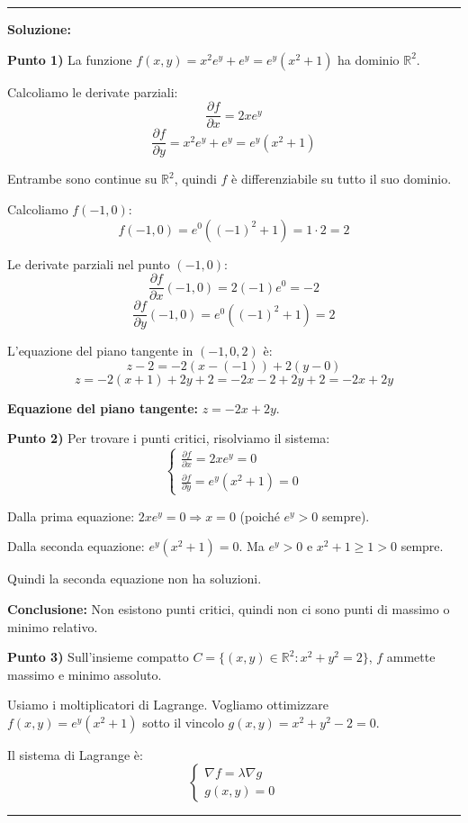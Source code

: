 \documentclass[12pt, a4paper]{article}
\newenvironment{solution}
{\par\noindent\rule{\textwidth}{0.4pt}\par\textbf{Soluzione:}\medskip\par}
{\par\rule{\textwidth}{0.4pt}\par\bigskip}
\begin{document}
\begin{solution}
\textbf{Punto 1)} La funzione $f(x,y) = x^2 e^y + e^y = e^y(x^2 + 1)$ ha dominio $\mathbb{R}^2$.

Calcoliamo le derivate parziali:
\[
\frac{\partial f}{\partial x} = 2xe^y
\]
\[
\frac{\partial f}{\partial y} = x^2 e^y + e^y = e^y(x^2 + 1)
\]

Entrambe sono continue su $\mathbb{R}^2$, quindi $f$ è differenziabile su tutto il suo dominio.

Calcoliamo $f(-1,0)$:
\[
f(-1,0) = e^0((-1)^2 + 1) = 1 \cdot 2 = 2
\]

Le derivate parziali nel punto $(-1,0)$:
\[
\frac{\partial f}{\partial x}(-1,0) = 2(-1)e^0 = -2
\]
\[
\frac{\partial f}{\partial y}(-1,0) = e^0((-1)^2 + 1) = 2
\]

L'equazione del piano tangente in $(-1,0,2)$ è:
\[
z - 2 = -2(x - (-1)) + 2(y - 0)
\]
\[
z = -2(x + 1) + 2y + 2 = -2x - 2 + 2y + 2 = -2x + 2y
\]

\textbf{Equazione del piano tangente:} $z = -2x + 2y$.

\vspace{0.5cm}

\textbf{Punto 2)} Per trovare i punti critici, risolviamo il sistema:
\[
\begin{cases}
\frac{\partial f}{\partial x} = 2xe^y = 0 \\
\frac{\partial f}{\partial y} = e^y(x^2 + 1) = 0
\end{cases}
\]

Dalla prima equazione: $2xe^y = 0 \Rightarrow x = 0$ (poiché $e^y > 0$ sempre).

Dalla seconda equazione: $e^y(x^2 + 1) = 0$. Ma $e^y > 0$ e $x^2 + 1 \geq 1 > 0$ sempre.

Quindi la seconda equazione non ha soluzioni.

\textbf{Conclusione:} Non esistono punti critici, quindi non ci sono punti di massimo o minimo relativo.

\vspace{0.5cm}

\textbf{Punto 3)} Sull'insieme compatto $C = \{(x,y) \in \mathbb{R}^2 : x^2 + y^2 = 2\}$, $f$ ammette massimo e minimo assoluto.

Usiamo i moltiplicatori di Lagrange. Vogliamo ottimizzare $f(x,y) = e^y(x^2 + 1)$ sotto il vincolo $g(x,y) = x^2 + y^2 - 2 = 0$.

Il sistema di Lagrange è:
\[
\begin{cases}
\nabla f = \lambda \nabla g \\
g(x,y) = 0
\end{cases}
\]


\end{solution}
\end{document}
